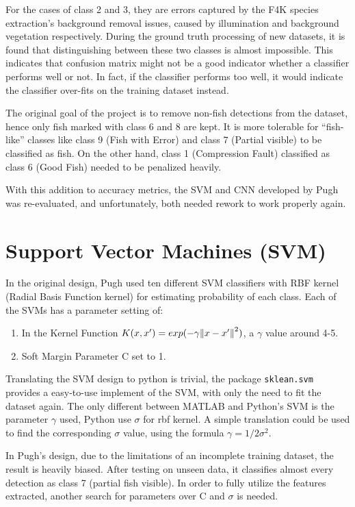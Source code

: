 \documentclass[bsc,frontabs,twoside,fullspacing,parskip,deptreport]{infthesis}
\begin{document}
For the cases of class 2 and 3, they are errors captured by the F4K species extraction's background removal issues, caused by illumination and background vegetation respectively.
During the ground truth processing of new datasets, it is found that distinguishing between these two classes is almost impossible.
This indicates that confusion matrix might not be a good indicator whether a classifier performs well or not. In fact, if the classifier performs too well, it would indicate the classifier over-fits on the training dataset instead.

The original goal of the project is to remove non-fish detections from the dataset, hence only fish marked with class 6 and 8 are kept. 
It is more tolerable for ``fish-like'' classes like class 9 (Fish with Error) and class 7 (Partial visible) to be classified as fish.
On the other hand, class 1 (Compression Fault) classified as class 6 (Good Fish) needed to be penalized heavily. 

With this addition to accuracy metrics, the SVM and CNN developed by Pugh was re-evaluated, and unfortunately, both needed rework to work properly again.

\section{Support Vector Machines (SVM)}

In the original design, Pugh used ten different SVM classifiers with RBF kernel (Radial Basis Function kernel) for estimating probability of each class. Each of the SVMs has a parameter setting of:
\renewcommand{\labelenumi}{\bfseries\arabic{enumi}}
\begin{enumerate}
\setlength{\parskip}{1pt}
	\item In the Kernel Function \(K(x,x') = exp(-\gamma\norm{x-x'}^2)\), a \(\gamma\) value around 4-5.
	\item Soft Margin Parameter C set to 1.
\end{enumerate}
Translating the SVM design to python is trivial, the package {\tt sklean.svm} provides a easy-to-use implement of the SVM, with only the need to fit the dataset again.
The only different between MATLAB and Python's SVM is the parameter \(\gamma\) used, Python use \(\sigma\) for rbf kernel. A simple translation could be used to find the corresponding \(\sigma\) value, using the formula \( \gamma = 1/2\sigma^2 \).

In Pugh's design, due to the limitations of an incomplete training dataset, the result is heavily biased. After testing on unseen data, it classifies almost every detection as class 7 (partial fish visible). In order to fully utilize the features extracted, another search for parameters over C and \(\sigma\) is needed.
\end{document}
